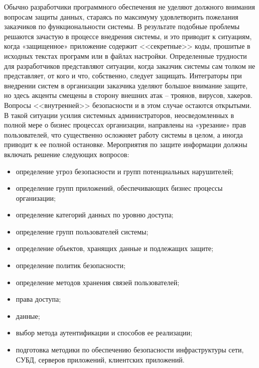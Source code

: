 Обычно разработчики программного обеспечения не
уделяют должного внимания вопросам защиты данных, стараясь по максимуму
удовлетворить пожелания заказчиков по функциональности системы. В результате
подобные проблемы решаются зачастую в процессе внедрения системы, и это приводит
к ситуациям, когда «защищенное» приложение содержит <<секретные>> коды, прошитые
в исходных текстах программ или в файлах настройки. Определенные трудности для
разработчиков представляют ситуации, когда заказчик системы сам толком не
представляет, от кого и что, собственно, следует защищать. Интеграторы при
внедрении систем в организации заказчика уделяют большое внимание защите, но
здесь акценты смещены в сторону внешних атак -- троянов, вирусов, хакеров.
Вопросы <<внутренней>> безопасности и в этом случае остаются открытыми. В такой
ситуации усилия системных администраторов, неосведомленных в полной мере о
бизнес процессах организации, направлены на «урезание» прав пользователей, что
существенно осложняет работу системы в целом, а иногда приводит к ее полной
остановке. Мероприятия по защите информации должны включать решение следующих
вопросов:
\begin{itemize}
  \item определение угроз безопасности и групп потенциальных нарушителей;
  \item определение групп приложений, обеспечивающих бизнес процессы
  организации;
  \item определение категорий данных по уровню доступа;
  \item определение групп
пользователей системы;
  \item определение объектов, хранящих данные и подлежащих
защите;
  \item определение политик безопасности;
  \item определение методов хранения
связей пользователей;
  \item права доступа;
  \item данные;
  \item выбор метода аутентификации и
способов ее реализации;
  \item подготовка методики по обеспечению безопасности
инфраструктуры сети, СУБД, серверов приложений, клиентских приложений.
\end{itemize}

